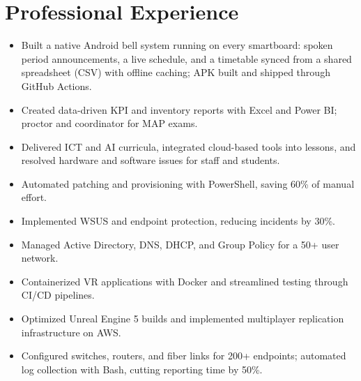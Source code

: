\documentclass[a4paper,10pt]{article}
\begin{document}
\section*{Professional Experience}
\begin{itemize}
  \item Built a native Android bell system running on every smartboard: spoken period announcements, a live schedule, and a timetable synced from a shared spreadsheet (CSV) with offline caching; APK built and shipped through GitHub Actions.
  \item Created data-driven KPI and inventory reports with Excel and Power BI; proctor and coordinator for MAP exams.
\end{itemize}
\begin{itemize}
  \item Delivered ICT and AI curricula, integrated cloud-based tools into lessons, and resolved hardware and software issues for staff and students.
\end{itemize}
\begin{itemize}
  \item Automated patching and provisioning with PowerShell, saving 60\% of manual effort.
  \item Implemented WSUS and endpoint protection, reducing incidents by 30\%.
  \item Managed Active Directory, DNS, DHCP, and Group Policy for a 50+ user network.
\end{itemize}
\begin{itemize}
  \item Containerized VR applications with Docker and streamlined testing through CI/CD pipelines.
  \item Optimized Unreal Engine 5 builds and implemented multiplayer replication infrastructure on AWS.
\end{itemize}
\begin{itemize}
  \item Configured switches, routers, and fiber links for 200+ endpoints; automated log collection with Bash, cutting reporting time by 50\%.
\end{itemize}
\end{document}
